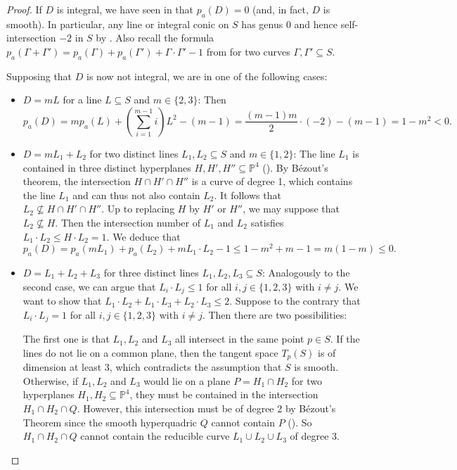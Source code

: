 \documentclass[english,11pt,reqno]{amsart}
\newcommand{\sub}{\subseteq}
\newcommand{\Pfour}{\mathbb{P}^4}
\begin{document}
\begin{proof}
If $D$ is integral, we have seen in  that $p_a(D)=0$ (and, in fact, $D$ is smooth). In particular, any line or integral conic on $S$ has genus 0 and hence self-intersection $-2$ in $S$ by . Also recall the formula $p_a(\Gamma + \Gamma')=p_a(\Gamma)+p_a(\Gamma')+\Gamma \cdot \Gamma'-1$ from  for two curves $\Gamma, \Gamma'\sub S$. \par
Supposing that $D$ is now not integral, we are in one of the following cases:
\begin{itemize}
\item $D=mL$ for a line $L\sub S$ and $m\in \{2,3\}$: Then $$p_a(D)=mp_a(L)+\left(\sum_{i=1}^{m-1}i\right)L^2-(m-1) = \frac{(m-1)m}{2}\cdot (-2) -(m-1)=1-m^2<0.$$
\item $D=mL_1+L_2$ for two distinct lines $L_1,L_2 \sub S$ and $m\in\{1,2\}$: The line $L_1$ is contained in three distinct hyperplanes $H, H',H''\sub \Pfour$ (). By Bézout's theorem, the intersection $H\cap H' \cap H''$ is a curve of degree 1, which contains the line $L_1$ and can thus not also contain $L_2$. It follows that $L_2\not \sub H\cap H'\cap H''$. Up to replacing $H$ by $H'$ or $H''$, we may suppose that $L_2\not \sub H$.  Then the intersection number of $L_1$ and $L_2$ satisfies $L_1 \cdot L_2 \leq H \cdot L_2 = 1$. We deduce that $$p_a(D)=p_a(mL_1)+p_a(L_2)+ mL_1 \cdot L_2 -1\leq 1-m^2+m-1=m(1-m)\leq 0.$$
\item $D=L_1+L_2+L_3$ for three distinct lines $L_1,L_2,L_3 \sub S$: Analogously to the second case, we can argue that $L_i\cdot L_j \leq 1$ for all $i,j\in\{1,2,3\}$ with $i\neq j$. We want to show that $L_1\cdot L_2 + L_1\cdot L_3 + L_2\cdot L_3 \leq 2$. Suppose to the contrary that $L_i\cdot L_j = 1$ for all $i,j\in\{1,2,3\}$ with $i\neq j$. Then there are two possibilities:\par 
The first one is that $L_1, L_2$ and $L_3$ all intersect in the same point $p\in S$. If the lines do not lie on a common plane, then the tangent space $T_p(S)$ is of dimension at least 3, which contradicts the assumption that $S$ is smooth. Otherwise, if $L_1,L_2$ and $L_3$ would lie on a plane $P=H_1\cap H_2$ for two hyperplanes $H_1,H_2\sub \Pfour$, they must be contained in the intersection $H_1\cap H_2\cap Q$. However, this intersection must be of degree 2 by Bézout's Theorem since the smooth hyperquadric $Q$ cannot contain $P$ (). So $H_1\cap H_2 \cap Q$ cannot contain the reducible curve $L_1\cup L_2 \cup L_3$ of degree 3. \par 

\end{itemize}
\end{proof}
\end{document}
